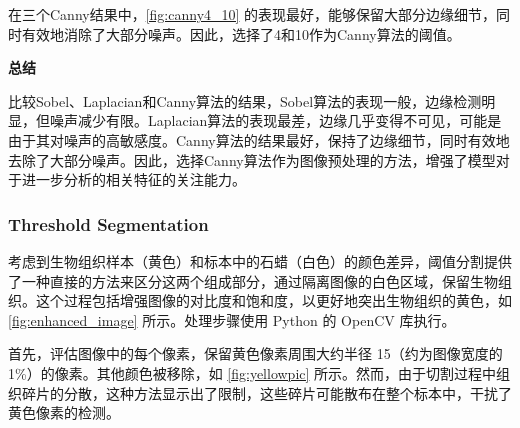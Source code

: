 在三个Canny结果中，\autoref{fig:canny4_10} 的表现最好，能够保留大部分边缘细节，同时有效地消除了大部分噪声。因此，选择了4和10作为Canny算法的阈值。

\textbf{总结}

比较Sobel、Laplacian和Canny算法的结果，Sobel算法的表现一般，边缘检测明显，但噪声减少有限。Laplacian算法的表现最差，边缘几乎变得不可见，可能是由于其对噪声的高敏感度。Canny算法的结果最好，保持了边缘细节，同时有效地去除了大部分噪声。因此，选择Canny算法作为图像预处理的方法，增强了模型对于进一步分析的相关特征的关注能力。

\subsubsection{Threshold Segmentation}
考虑到生物组织样本（黄色）和标本中的石蜡（白色）的颜色差异，阈值分割提供了一种直接的方法来区分这两个组成部分，通过隔离图像的白色区域，保留生物组织。这个过程包括增强图像的对比度和饱和度，以更好地突出生物组织的黄色，如 \autoref{fig:enhanced_image} 所示。处理步骤使用 Python 的 OpenCV 库执行。

首先，评估图像中的每个像素，保留黄色像素周围大约半径 15（约为图像宽度的 1\%）的像素。其他颜色被移除，如 \autoref{fig:yellowpic} 所示。然而，由于切割过程中组织碎片的分散，这种方法显示出了限制，这些碎片可能散布在整个标本中，干扰了黄色像素的检测。

